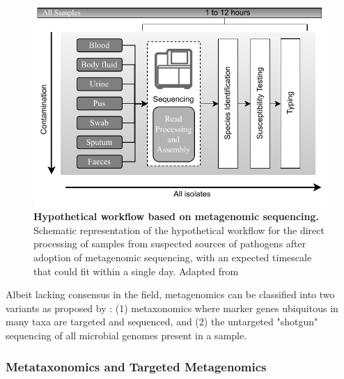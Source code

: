 \begin{figure}[h!]
\centering
\includegraphics[width=\textwidth]{figures/introduction/Figure 4.pdf}
\caption{\textbf{Hypothetical workflow based on metagenomic sequencing.} Schematic representation of the hypothetical workflow for the direct processing of samples from suspected sources of pathogens after adoption of metagenomic sequencing, with an expected timescale that could fit within a single day. Adapted from \cite{didelot_transforming_2012}}
\label{fig:figure4}
\end{figure}


Albeit lacking consensus in the field, metagenomics can be classified into two variants as proposed by \citep{marchesi_vocabulary_2015}: (1) metaxonomics where marker genes ubiquitous in many taxa are targeted and sequenced, and (2) the untargeted "shotgun" sequencing of all microbial genomes present in a sample. 

\subsubsection{Metataxonomics and Targeted Metagenomics} \label{sssec:metataxonomics}

